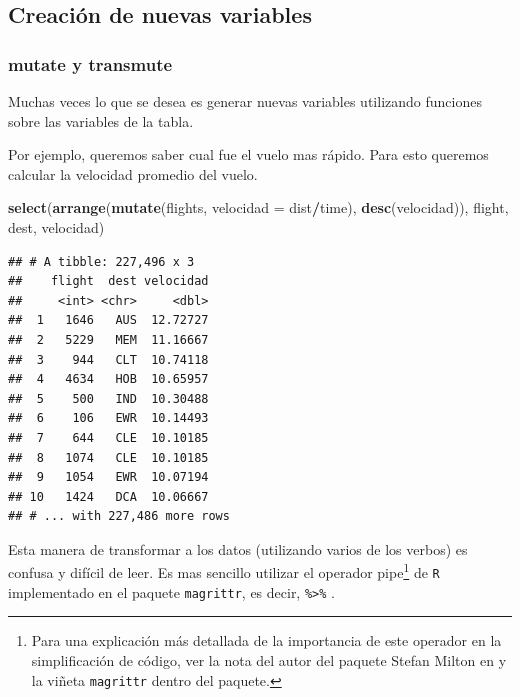 \documentclass[]{article}
\newenvironment{Shaded}{\begin{snugshade}}{\end{snugshade}}
\newcommand{\KeywordTok}[1]{\textcolor[rgb]{0.13,0.29,0.53}{\textbf{#1}}}
\newcommand{\DataTypeTok}[1]{\textcolor[rgb]{0.13,0.29,0.53}{#1}}
\newcommand{\StringTok}[1]{\textcolor[rgb]{0.31,0.60,0.02}{#1}}
\newcommand{\OperatorTok}[1]{\textcolor[rgb]{0.81,0.36,0.00}{\textbf{#1}}}
\newcommand{\NormalTok}[1]{#1}
\let\rmarkdownfootnote\footnote%
\def\footnote{\protect\rmarkdownfootnote}
\begin{document}
\subsection{Creación de nuevas
variables}\label{creacion-de-nuevas-variables}

\subsubsection{mutate y transmute}\label{mutate-y-transmute}

Muchas veces lo que se desea es generar nuevas variables utilizando
funciones sobre las variables de la tabla.

Por ejemplo, queremos saber cual fue el vuelo mas rápido. Para esto
queremos calcular la velocidad promedio del vuelo.

\begin{Shaded}
\begin{Highlighting}[]
\KeywordTok{select}\NormalTok{(}\KeywordTok{arrange}\NormalTok{(}\KeywordTok{mutate}\NormalTok{(flights, }\DataTypeTok{velocidad =}\NormalTok{ dist}\OperatorTok{/}\NormalTok{time), }\KeywordTok{desc}\NormalTok{(velocidad)),}
\NormalTok{       flight, dest, velocidad)}
\end{Highlighting}
\end{Shaded}

\begin{verbatim}
## # A tibble: 227,496 x 3
##    flight  dest velocidad
##     <int> <chr>     <dbl>
##  1   1646   AUS  12.72727
##  2   5229   MEM  11.16667
##  3    944   CLT  10.74118
##  4   4634   HOB  10.65957
##  5    500   IND  10.30488
##  6    106   EWR  10.14493
##  7    644   CLE  10.10185
##  8   1074   CLE  10.10185
##  9   1054   EWR  10.07194
## 10   1424   DCA  10.06667
## # ... with 227,486 more rows
\end{verbatim}

Esta manera de transformar a los datos (utilizando varios de los verbos)
es confusa y difícil de leer. Es mas sencillo utilizar el operador
pipe\footnote{Para una explicación más detallada de la importancia de este operador en la simplificación de código, ver la nota del autor del paquete Stefan Milton en \textcite{simplermagrittr} y la viñeta \texttt{magrittr} dentro del paquete.}
de \texttt{R} implementado en el paquete \texttt{magrittr}, es decir,
\texttt{\%\textgreater{}\%} \parencite{magrittr}.

\begin{Shaded}
\end{Shaded}
\end{document}
